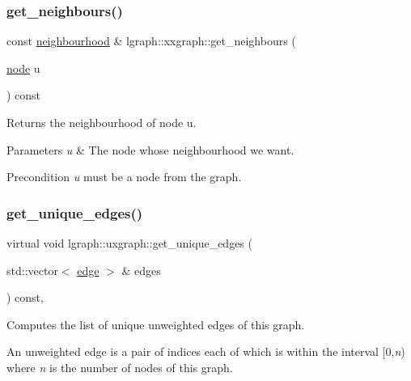 \subsubsection{\texorpdfstring{get\+\_\+neighbours()}{get\_neighbours()}}
{\footnotesize\ttfamily const \hyperlink{namespacelgraph_a052e7766c13f3a43cec0aec8173fdede}{neighbourhood} \& lgraph\+::xxgraph\+::get\+\_\+neighbours (\begin{DoxyParamCaption}\item[{\hyperlink{namespacelgraph_a397169dd66adf725210a30fb7251773e}{node}}]{u }\end{DoxyParamCaption}) const\hspace{0.3cm}{\ttfamily [inherited]}}



Returns the neighbourhood of node u. 


\begin{DoxyParams}{Parameters}
{\em u} & The node whose neighbourhood we want. \\
\hline
\end{DoxyParams}
\begin{DoxyPrecond}{Precondition}
{\itshape u} must be a node from the graph. 
\end{DoxyPrecond}
\mbox{\label{classlgraph_1_1uxgraph_a5a014396ad3bd800028be641c140e5a0}} 
\subsubsection{\texorpdfstring{get\+\_\+unique\+\_\+edges()}{get\_unique\_edges()}}
{\footnotesize\ttfamily virtual void lgraph\+::uxgraph\+::get\+\_\+unique\+\_\+edges (\begin{DoxyParamCaption}\item[{std\+::vector$<$ \hyperlink{namespacelgraph_a76bd7d50719f03de7a85db259d80d572}{edge} $>$ \&}]{edges }\end{DoxyParamCaption}) const\hspace{0.3cm}{\ttfamily [protected]}, {}}



Computes the list of unique unweighted edges of this graph. 

An unweighted edge is a pair of indices each of which is within the interval \mbox{[}0,{\itshape n}) where {\itshape n} is the number of nodes of this graph.


